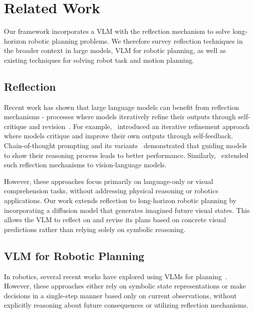 \section{Related Work}\label{sec:related_work}
Our framework incorporates a VLM with the reflection mechanism to solve long-horizon robotic planning problems. We therefore survey reflection techniques in the broader context in large models, VLM for robotic planning, as well as existing techniques for solving robot task and motion planning.

\subsection{Reflection}
Recent work has shown that large language models can benefit from reflection mechanisms - processes where models iteratively refine their outputs through self-critique and revision~\citep{renze2024self, shinn2024reflexion, pan2023automatically, madaan2024self, asai2023self, wang2023selfinstructaligninglanguagemodels, huang2024llmcorrect}. For example,~\citet{madaan2024self} introduced an iterative refinement approach where models critique and improve their own outputs through self-feedback. Chain-of-thought prompting and its variants~\citep{wei2022chain, wang2022self, yao2024tree} demonstrated that guiding models to show their reasoning process leads to better performance. Similarly,~\citet{cheng2024vlmimproving, yu2025exactteachingaiagents} extended such reflection mechanisms to vision-language models.

However, these approaches focus primarily on language-only or visual comprehension tasks, without addressing physical reasoning or robotics applications. Our work extends reflection to long-horizon robotic planning by incorporating a diffusion model that generates imagined future visual states. This allows the VLM to reflect on and revise its plans based on concrete visual predictions rather than relying solely on symbolic reasoning.

\subsection{VLM for Robotic Planning} 
In robotics, several recent works have explored using VLMs for planning~\citep{palm-e2023, rt1, rt2, hu2023lookleapunveilingpower, huang2023voxposer, belkhale2024rth, nasiriany2024pivot, liu2024moka, shi2024yal, wake2024gpt}. However, these approaches either rely on symbolic state representations or make decisions in a single-step manner based only on current observations, without explicitly reasoning about future consequences or utilizing reflection mechanisms.

